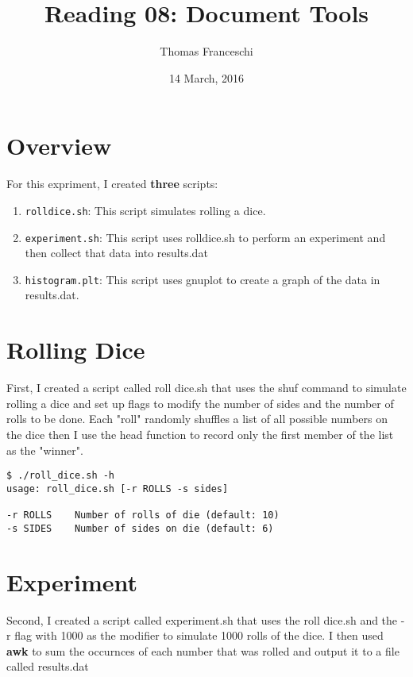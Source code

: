 \documentclass{article}
\title{Reading 08: Document Tools}
\date{14 March, 2016}
\author{Thomas Franceschi}
\begin{document}
\maketitle


\section*{Overview}

For this expriment, I created {\bf three} scripts:

\begin{enumerate}

\item{\tt rolldice.sh}: This script simulates rolling a dice.

\item{\tt experiment.sh}: This script uses rolldice.sh to perform an experiment and then collect that data into results.dat

\item{\tt histogram.plt}: This script uses gnuplot to create a graph of the data in results.dat.

\end{enumerate}

\section*{Rolling Dice}

First, I created a script called roll dice.sh that uses the shuf command to simulate rolling a dice and set up flags
to modify the number of sides and the number of rolls to be done. Each "roll" randomly shuffles a list of all possible 
numbers on the dice then I use the head function to record only the first member of the list as the "winner".

\begin{verbatim}
$ ./roll_dice.sh -h
usage: roll_dice.sh [-r ROLLS -s sides]

-r ROLLS    Number of rolls of die (default: 10)
-s SIDES    Number of sides on die (default: 6)

\end{verbatim}

\section*{Experiment}

Second, I created a script called experiment.sh that uses the roll dice.sh and the -r flag with 1000 as the modifier to simulate 
1000 rolls of the dice. I then used {\bf awk} to sum the occurnces of each number that was rolled and output it to a file called results.dat
\end{document}
